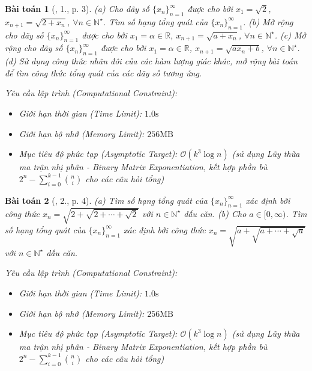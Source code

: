 \documentclass{article}
\newtheorem{baitoan}{Bài toán}
\begin{document}
\begin{baitoan}[\cite{Chung_day_so}, 1., p. 3]
	(a) Cho dãy số $\{x_n\}_{n=1}^\infty$ được cho bởi $x_1 = \sqrt{2}$, $x_{n+1} = \sqrt{2 + x_n}$, $\forall n\in\mathbb{N}^\star$. Tìm số hạng tổng quát của $\{x_n\}_{n=1}^\infty$. (b) Mở rộng cho dãy số $\{x_n\}_{n=1}^\infty$ được cho bởi $x_1 = \alpha\in\mathbb{R}$, $x_{n+1} = \sqrt{a + x_n}$, $\forall n\in\mathbb{N}^\star$. (c) Mở rộng cho dãy số $\{x_n\}_{n=1}^\infty$ được cho bởi $x_1 = \alpha\in\mathbb{R}$, $x_{n+1} = \sqrt{ax_n + b}$, $\forall n\in\mathbb{N}^\star$. (d) Sử dụng công thức nhân đôi của các hàm lượng giác khác, mở rộng bài toán để tìm công thức tổng quát của các dãy số tương ứng.

    \vspace{0.5em}
    \emph{Yêu cầu lập trình (Computational Constraint):}
    \begin{itemize}
        \item Giới hạn thời gian (Time Limit): $1.0\mathrm{s}$
        \item Giới hạn bộ nhớ (Memory Limit): $256\mathrm{MB}$
        \item Mục tiêu độ phức tạp (Asymptotic Target): $\mathcal{O}(k^3 \log n)$ (sử dụng Lũy thừa ma trận nhị phân - Binary Matrix Exponentiation, kết hợp phần bù $2^n - \sum_{i=0}^{k-1} \binom{n}{i}$ cho các câu hỏi tổng)
    \end{itemize}
\end{baitoan}


\begin{baitoan}[\cite{Chung_day_so}, 2., p. 4]
	(a) Tìm số hạng tổng quát của $\{x_n\}_{n=1}^\infty$ xác định bởi công thức $x_n = \sqrt{2 + \sqrt{2 + \cdots + \sqrt{2}}}$ với $n\in\mathbb{N}^\star$ dấu căn. (b) Cho $a\in[0,\infty)$. Tìm số hạng tổng quát của $\{x_n\}_{n=1}^\infty$ xác định bởi công thức $x_n = \sqrt{a + \sqrt{a + \cdots + \sqrt{a}}}$ với $n\in\mathbb{N}^\star$ dấu căn.

    \vspace{0.5em}
    \emph{Yêu cầu lập trình (Computational Constraint):}
    \begin{itemize}
        \item Giới hạn thời gian (Time Limit): $1.0\mathrm{s}$
        \item Giới hạn bộ nhớ (Memory Limit): $256\mathrm{MB}$
        \item Mục tiêu độ phức tạp (Asymptotic Target): $\mathcal{O}(k^3 \log n)$ (sử dụng Lũy thừa ma trận nhị phân - Binary Matrix Exponentiation, kết hợp phần bù $2^n - \sum_{i=0}^{k-1} \binom{n}{i}$ cho các câu hỏi tổng)
    \end{itemize}
\end{baitoan}
\end{document}
